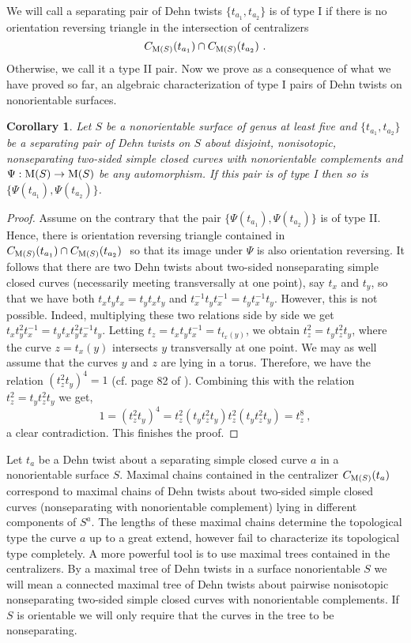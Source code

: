 \documentclass[11 pt]{amsart}
\newtheorem{Corollary}[Theorem]{Corollary}
\theoremstyle{definition}
\begin{document}
We will call a separating pair of Dehn twists $\{t_{a_1},t_{a_2}\}$
is of type I if there is no orientation reversing triangle in the
intersection of centralizers $$C_{{\rm M}(S)}(t_{a_1})\cap C_{{\rm
M}(S)}(t_{a_2}) \ .$$ Otherwise, we call it a type II pair. Now we
prove as a consequence of what we have proved so far, an algebraic
characterization of type I pairs of Dehn twists on nonorientable
surfaces.

\begin{Corollary}\label{Characterization of Type I}
Let $S$ be a nonorientable surface of genus at least five and
$\{t_{a_1},t_{a_2}\}$ be a separating pair of Dehn twists on $S$
about disjoint, nonisotopic, nonseparating two-sided simple closed
curves with nonorientable complements and  $\Psi:{\rm
M}(S)\rightarrow {\rm M}(S)$ be any automorphism. If this pair is of
type I then so is $\{\Psi(t_{a_1}),\Psi(t_{a_2})\}$.
\end{Corollary}

\begin{proof}  Assume on the contrary that the pair
$\{\Psi(t_{a_1}),\Psi(t_{a_2})\}$ is of type II. Hence, there is
orientation reversing triangle contained in $C_{{\rm
M}(S)}(t_{a_1})\cap C_{{\rm M}(S)}(t_{a_2}) \ $ so that its image
under $\Psi$ is also orientation reversing. It follows that there
are two Dehn twists about two-sided nonseparating simple closed
curves (necessarily meeting transversally at one point), say $t_x$
and $t_y$, so that we have both $t_xt_yt_x=t_yt_xt_y$ and
$t^{-1}_xt_yt^{-1}_x=t_yt^{-1}_xt_y$. However, this is not possible.
Indeed, multiplying these two relations side by side we get
$t_xt_y^2t^{-1}_x=t_yt_xt_y^2t^{-1}_xt_y$. Letting
$t_z=t_xt_yt^{-1}_x=t_{t_x(y)}$, we obtain $t_z^2=t_yt_z^2t_y$,
where the curve $z=t_x(y)$ intersects $y$ transversally at one
point. We may as well assume that the curves $y$ and $z$ are lying
in a torus. Therefore, we have the relation $(t_z^2t_y)^4=1$ (cf.
page 82 of \cite{F-M}). Combining this with the relation
$t_z^2=t_yt_z^2t_y$ we get,
$$1=(t_z^2t_y)^4=t_z^2(t_yt_z^2t_y)t_z^2(t_yt_z^2t_y)=t_z^8 \ ,$$ a
clear contradiction. This finishes the proof.
\end{proof}

Let $t_a$  be a Dehn twist about a separating simple closed curve
$a$ in a nonorientable surface $S$. Maximal chains contained in the
centralizer $C_{{\rm M}(S)}(t_a)$ correspond to maximal chains of
Dehn twists about two-sided simple closed curves (nonseparating with
nonorientable complement) lying in different components of $S^a$.
The lengths of these maximal chains determine the topological type
the curve $a$ up to a great extend, however fail to characterize its
topological type completely. A more powerful tool is to use maximal
trees contained in the centralizers. By a maximal tree of Dehn
twists in a surface nonorientable $S$ we will mean a connected
maximal tree of Dehn twists about pairwise nonisotopic nonseparating
two-sided simple closed curves with nonorientable complements. If
$S$ is orientable we will only require that the curves in the tree
to be nonseparating.
\end{document}
